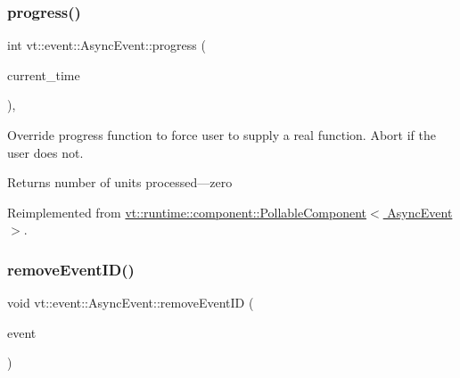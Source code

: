 \mbox{\label{structvt_1_1event_1_1_async_event_aa99cf6ece5deebbe4f43c9d21a78a2aa}} 
\subsubsection{\texorpdfstring{progress()}{progress()}}
{\footnotesize\ttfamily int vt\+::event\+::\+Async\+Event\+::progress (\begin{DoxyParamCaption}\item[{\hyperlink{namespacevt_a2b9f28078dc309ad0706b69ded743e69}{Time\+Type}}]{current\+\_\+time }\end{DoxyParamCaption})\hspace{0.3cm}{\ttfamily [override]}, {\ttfamily [virtual]}}



Override progress function to force user to supply a real function. Abort if the user does not. 

\begin{DoxyReturn}{Returns}
number of units processed---zero 
\end{DoxyReturn}


Reimplemented from \hyperlink{structvt_1_1runtime_1_1component_1_1_pollable_component_a51939e8b7e895a377c10c6767034396b}{vt\+::runtime\+::component\+::\+Pollable\+Component$<$ Async\+Event $>$}.

\mbox{\label{structvt_1_1event_1_1_async_event_a67a603eff81f5f912118f38fd5cbaccb}} 
\subsubsection{\texorpdfstring{remove\+Event\+I\+D()}{removeEventID()}}
{\footnotesize\ttfamily void vt\+::event\+::\+Async\+Event\+::remove\+Event\+ID (\begin{DoxyParamCaption}\item[{\hyperlink{namespacevt_a009267401def7ae8bf201892222d060f}{Event\+Type} const \&}]{event }\end{DoxyParamCaption})}

